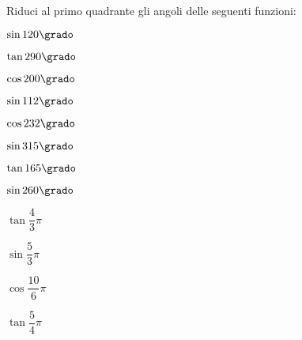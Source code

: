 \begin{esercizio}\label{ese:03.1}
Riduci al primo quadrante gli angoli delle seguenti funzioni:
\begin{multicols}{4}
 \begin{enumeratea}
  \item $\sin 120 \grado$
   \hfill
  \item $\tan 290 \grado$
   \hfill
  \item $\cos 200 \grado$ 
   \hfill
  \item $\sin 112 \grado$ 
   \hfill
  \item $\cos 232 \grado$ 
   \hfill
  \item $\sin 315 \grado$ 
   \hfill
  \item $\tan 165 \grado$ 
   \hfill
  \item $\sin 260 \grado$ 
   \hfill
  \item $\tan \dfrac{4}{3}\pi$ 
   \hfill
  \item $\sin \dfrac{5}{3}\pi$ 
   \hfill
  \item $\cos \dfrac{10}{6}\pi$ 
   \hfill
  \item $\tan \dfrac{5}{4}\pi$ 
   \hfill
 \end{enumeratea}
 \end{multicols}
\end{esercizio}

\subsubsection*{}

